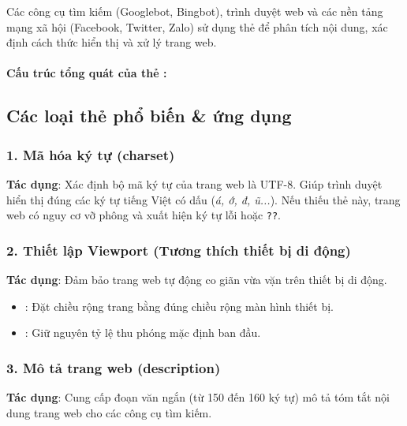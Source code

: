 Các công cụ tìm kiếm (Googlebot, Bingbot), trình duyệt web và các nền tảng mạng xã hội (Facebook, Twitter, Zalo) sử dụng thẻ  để phân tích nội dung, xác định cách thức hiển thị và xử lý trang web.

\paragraph{Cấu trúc tổng quát của thẻ :}
\begin{center}
\end{center}

\subsection{Các loại thẻ  phổ biến \& ứng dụng}

\subsubsection{1. Mã hóa ký tự (charset)}
\begin{center}
\end{center}
\textbf{Tác dụng}: Xác định bộ mã ký tự của trang web là UTF-8. Giúp trình duyệt hiển thị đúng các ký tự tiếng Việt có dấu (\textit{á, ớ, đ, ũ...}). Nếu thiếu thẻ này, trang web có nguy cơ vỡ phông và xuất hiện ký tự lỗi \texttt{} hoặc \texttt{??}.

\subsubsection{2. Thiết lập Viewport (Tương thích thiết bị di động)}
\begin{center}
\end{center}
\textbf{Tác dụng}: Đảm bảo trang web tự động co giãn vừa vặn trên thiết bị di động.
\begin{itemize}[leftmargin=1.8em, itemsep=2pt, parsep=0pt]
    \item {}: Đặt chiều rộng trang bằng đúng chiều rộng màn hình thiết bị.
    \item {}: Giữ nguyên tỷ lệ thu phóng mặc định ban đầu.
\end{itemize}

\subsubsection{3. Mô tả trang web (description)}
\begin{center}
\end{center}
\textbf{Tác dụng}: Cung cấp đoạn văn ngắn (từ 150 đến 160 ký tự) mô tả tóm tắt nội dung trang web cho các công cụ tìm kiếm.


